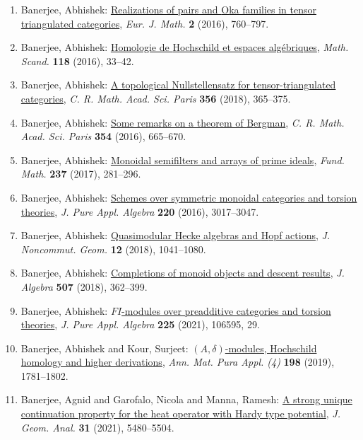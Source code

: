 \begin{enumerate}
\item Banerjee, Abhishek: \href{http://dx.doi.org/10.1007/s40879-016-0108-2}{Realizations of pairs and {O}ka families in tensor
triangulated categories}, \emph{Eur. J. Math.} {\bf 2} (2016), 760--797.
\item Banerjee, Abhishek: \href{http://dx.doi.org/10.7146/math.scand.a-23294}{Homologie de {H}ochschild et espaces alg\'ebriques}, \emph{Math. Scand.} {\bf 118} (2016), 33--42.
\item Banerjee, Abhishek: \href{https://doi.org/10.1016/j.crma.2018.02.012}{A topological {N}ullstellensatz for tensor-triangulated
categories}, \emph{C. R. Math. Acad. Sci. Paris} {\bf 356} (2018), 365--375.
\item Banerjee, Abhishek: \href{http://dx.doi.org/10.1016/j.crma.2016.05.005}{Some remarks on a theorem of {B}ergman}, \emph{C. R. Math. Acad. Sci. Paris} {\bf 354} (2016), 665--670.
\item Banerjee, Abhishek: \href{https://doi.org/10.4064/fm218-8-2016}{Monoidal semifilters and arrays of prime ideals}, \emph{Fund. Math.} {\bf 237} (2017), 281--296.
\item Banerjee, Abhishek: \href{http://dx.doi.org/10.1016/j.jpaa.2016.02.001}{Schemes over symmetric monoidal categories and torsion
theories}, \emph{J. Pure Appl. Algebra} {\bf 220} (2016), 3017--3047.
\item Banerjee, Abhishek: \href{https://doi.org/10.4171/JNCG/297}{Quasimodular {H}ecke algebras and {H}opf actions}, \emph{J. Noncommut. Geom.} {\bf 12} (2018), 1041--1080.
\item Banerjee, Abhishek: \href{https://doi.org/10.1016/j.jalgebra.2018.04.022}{Completions of monoid objects and descent results}, \emph{J. Algebra} {\bf 507} (2018), 362--399.
\item Banerjee, Abhishek: \href{https://doi.org/10.1016/j.jpaa.2020.106595}{{$FI$}-modules over preadditive categories and torsion
theories}, \emph{J. Pure Appl. Algebra} {\bf 225} (2021), 106595, 29.
\item Banerjee, Abhishek and Kour, Surjeet: \href{https://doi.org/10.1007/s10231-019-00844-x}{{$(A,\delta)$}-modules, {H}ochschild homology and higher
derivations}, \emph{Ann. Mat. Pura Appl. (4)} {\bf 198} (2019), 1781--1802.
\item Banerjee, Agnid and Garofalo, Nicola and Manna, Ramesh: \href{https://doi.org/10.1007/s12220-020-00487-y}{A strong unique continuation property for the heat operator
with {H}ardy type potential}, \emph{J. Geom. Anal.} {\bf 31} (2021), 5480--5504.

\end{enumerate}
